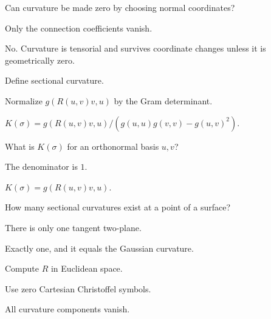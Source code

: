 \begin{exercise}\label{exr:vii26-11}
Can curvature be made zero by choosing normal coordinates?
\end{exercise}
\begin{hint}
Only the connection coefficients vanish.
\end{hint}
\begin{solution}
No. Curvature is tensorial and survives coordinate changes unless it is geometrically zero.
\end{solution}

\begin{exercise}\label{exr:vii26-12}
Define sectional curvature.
\end{exercise}
\begin{hint}
Normalize \(g(R(u,v)v,u)\) by the Gram determinant.
\end{hint}
\begin{solution}
\(K(\sigma)=g(R(u,v)v,u)/(g(u,u)g(v,v)-g(u,v)^2)\).
\end{solution}

\begin{exercise}\label{exr:vii26-13}
What is \(K(\sigma)\) for an orthonormal basis \(u,v\)?
\end{exercise}
\begin{hint}
The denominator is \(1\).
\end{hint}
\begin{solution}
\(K(\sigma)=g(R(u,v)v,u)\).
\end{solution}

\begin{exercise}\label{exr:vii26-14}
How many sectional curvatures exist at a point of a surface?
\end{exercise}
\begin{hint}
There is only one tangent two-plane.
\end{hint}
\begin{solution}
Exactly one, and it equals the Gaussian curvature.
\end{solution}

\begin{exercise}\label{exr:vii26-15}
Compute \(R\) in Euclidean space.
\end{exercise}
\begin{hint}
Use zero Cartesian Christoffel symbols.
\end{hint}
\begin{solution}
All curvature components vanish.
\end{solution}

